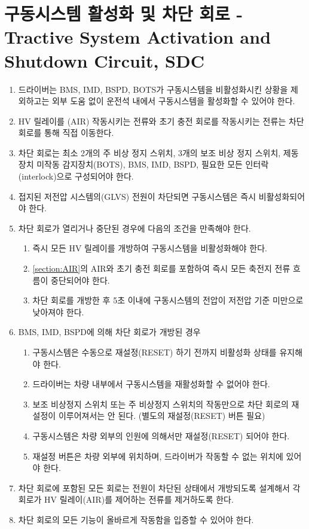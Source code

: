\documentclass[final,a4paper,10pt]{report}
\begin{document}
\section{구동시스템 활성화 및 차단 회로 - Tractive System Activation and Shutdown Circuit, SDC} \label{section:차단 회로}
\begin{enumerate}
  \item 드라이버는 BMS, IMD, BSPD, BOTS가 구동시스템을 비활성화시킨 상황을 제외하고는 외부 도움 없이 운전석 내에서 구동시스템을 활성화할 수 있어야 한다.
  \item HV 릴레이를 (AIR) 작동시키는 전류와 초기 충전 회로를 작동시키는 전류는 차단 회로를 통해 직접 이동한다. \label{item:차단 회로 전류}
  \item 차단 회로는 최소 2개의 주 비상 정지 스위치, 3개의 보조 비상 정지 스위치, 제동장치 미작동 감지장치(BOTS), BMS, IMD, BSPD, 필요한 모든 인터락(interlock)으로 구성되어야 한다.
  \item 접지된 저전압 시스템의(GLVS) 전원이 차단되면 구동시스템은 즉시 비활성화되어야 한다. \label{item:구동시스템 비활성화}
  
  \item 차단 회로가 열리거나 중단된 경우에 다음의 조건을 만족해야 한다. \label{item:차단 회로 작동}
    \begin{enumerate}
      \item 즉시 모든 HV 릴레이를 개방하여 구동시스템을 비활성화해야 한다.
      \item \cref{section:AIR}의 AIR와 초기 충전 회로를 포함하여 즉시 모든 축전지 전류 흐름이 중단되어야 한다.
      \item 차단 회로를 개방한 후 5초 이내에 구동시스템의 전압이 저전압 기준 미만으로 낮아져야 한다.
    \end{enumerate}
    
  \item BMS, IMD, BSPD에 의해 차단 회로가 개방된 경우 \label{item:차단 회로 개방}
    \begin{enumerate}
      \item 구동시스템은 수동으로 재설정(RESET) 하기 전까지 비활성화 상태를 유지해야 한다.
      \item 드라이버는 차량 내부에서 구동시스템을 재활성화할 수 없어야 한다.
      \item 보조 비상정지 스위치 또는 주 비상정지 스위치의 작동만으로 차단 회로의 재설정이 이루어져서는 안 된다. (별도의 재설정(RESET) 버튼 필요)
      \item 구동시스템은 차량 외부의 인원에 의해서만 재설정(RESET) 되어야 한다.
      \item 재설정 버튼은 차량 외부에 위치하며, 드라이버가 작동할 수 없는 위치에 있어야 한다.
    \end{enumerate}

  \item 차단 회로에 포함된 모든 회로는 전원이 차단된 상태에서 개방되도록 설계해서 각 회로가 HV 릴레이(AIR)를 제어하는 전류를 제거하도록 한다. \label{item:차단 회로 전원 차단}
  \item 차단 회로의 모든 기능이 올바르게 작동함을 입증할 수 있어야 한다. \label{item:차단 회로 입증}
\end{enumerate}
\end{document}
